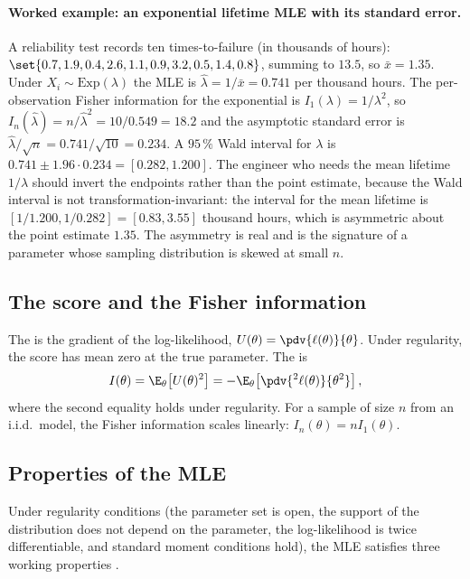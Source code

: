 \paragraph{Worked example: an exponential lifetime MLE with its
standard error.} A reliability test records ten times-to-failure
(in thousands of hours): $\set{0.7, 1.9, 0.4, 2.6, 1.1, 0.9, 3.2,
0.5, 1.4, 0.8}$, summing to $13.5$, so $\bar{x} = 1.35$. Under
$X_{i} \sim \mathrm{Exp}(\lambda)$ the MLE is $\hat{\lambda} =
1/\bar{x} = 0.741$ per thousand hours. The per-observation Fisher
information for the exponential is $I_{1}(\lambda) = 1/\lambda^{2}$,
so $I_{n}(\hat{\lambda}) = n/\hat{\lambda}^{2} = 10/0.549 = 18.2$
and the asymptotic standard error is $\hat{\lambda}/\sqrt{n} =
0.741/\sqrt{10} = 0.234$. A $95\,\%$ Wald interval for $\lambda$
is $0.741 \pm 1.96 \cdot 0.234 = [0.282, 1.200]$. The engineer who
needs the mean lifetime $1/\lambda$ should invert the endpoints
rather than the point estimate, because the Wald interval is not
transformation-invariant: the interval for the mean lifetime is
$[1/1.200, 1/0.282] = [0.83, 3.55]$ thousand hours, which is
asymmetric about the point estimate $1.35$. The asymmetry is real
and is the signature of a parameter whose sampling distribution is
skewed at small $n$.

\subsection{The score and the Fisher information}

The  is the gradient of the log-likelihood,
$U(\theta) = \pdv{\ell(\theta)}{\theta}$. Under regularity, the
score has mean zero at the true parameter. The  is
\[
I(\theta) = \E_{\theta}\!\left[U(\theta)^{2}\right]
          = -\E_{\theta}\!\left[\pdv{^{2}\ell(\theta)}{\theta^{2}}\right],
\]
where the second equality holds under regularity. For a sample of
size $n$ from an i.i.d.\ model, the Fisher information scales
linearly: $I_{n}(\theta) = n I_{1}(\theta)$.

\subsection{Properties of the MLE}

Under regularity conditions (the parameter set is open, the support
of the distribution does not depend on the parameter, the
log-likelihood is twice differentiable, and standard moment
conditions hold), the MLE satisfies three working properties
\cite[ch.~9]{text:wasserman2004}.

